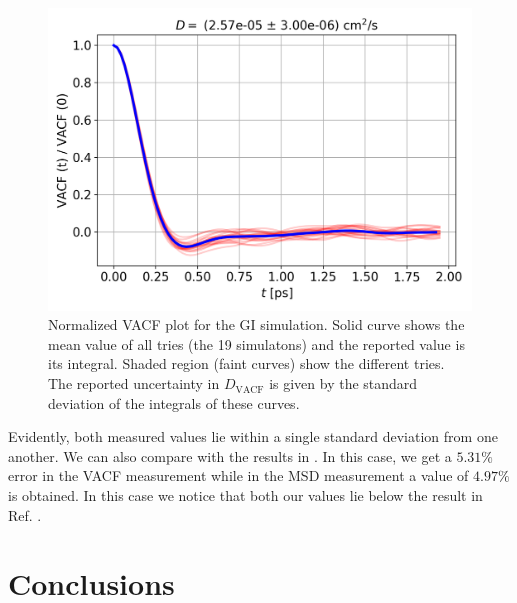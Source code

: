\documentclass[%
aps,
pra,%
amsmath,amssymb,
preprint,%
reprint,%
notitlepage,
a4paper]{revtex4-1}
\begin{document}
\begin{figure}
	\centering
	\includegraphics[width=0.9\linewidth]{../task2/results/vacfvst}
	\caption{Normalized VACF plot for the GI simulation. Solid curve shows the mean value of all tries (the 19 simulatons) and the reported value is its integral. Shaded region (faint curves) show the different tries. The reported uncertainty in $D_\mathrm{VACF}$ is given by the standard deviation of the integrals of these curves.}
	\label{fig:vacfvst}
\end{figure}
Evidently, both measured values lie within a single standard deviation from one another. We can also compare with the results in \citep{Rahman1964}. In this case, we get a $5.31\%$ error in the VACF measurement while in the MSD measurement a value of $4.97\%$ is obtained. In this case we notice that both our values lie below the result in Ref. \cite{Rahman1964}.
\section{Conclusions}




	
\end{document}
